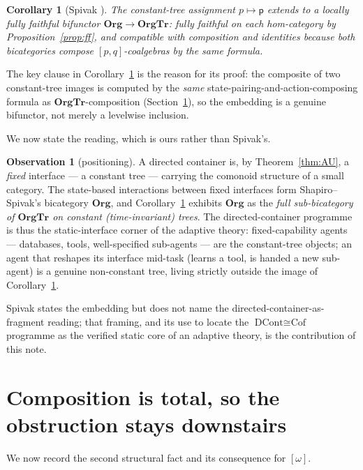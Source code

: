 \documentclass[11pt]{amsart}
\newtheorem{corollary}[theorem]{Corollary}
\theoremstyle{definition}
\newtheorem{observation}[theorem]{Observation}
\theoremstyle{remark}
\newcommand{\OrgTr}{\mathbf{OrgTr}}
\newcommand{\Org}{\mathbf{Org}}
\begin{document}
\begin{corollary}[Spivak {\cite[Cor.~4.8]{SpivakOrgTr}}]\label{cor:bifunctor}
The constant-tree assignment $p\mapsto\mathsf{p}$ extends to a locally fully faithful
bifunctor $\Org\to\OrgTr$: fully faithful on each hom-category by
Proposition~\textup{\ref{prop:ff}}, and compatible with composition and identities because
both bicategories compose $[p,q]$-coalgebras by the same formula.
\end{corollary}

The key clause in Corollary~\ref{cor:bifunctor} is the reason for its proof: the composite
of two constant-tree images is computed by the \emph{same} state-pairing-and-action-composing
formula as $\OrgTr$-composition (Section~\ref{sec:total}), so the embedding is a genuine
bifunctor, not merely a levelwise inclusion.

We now state the reading, which is ours rather than Spivak's.

\begin{observation}[positioning]\label{obs:positioning}
A directed container is, by Theorem~\textup{\ref{thm:AU}}, a \emph{fixed} interface --- a
constant tree --- carrying the comonoid structure of a small category. The state-based
interactions between fixed interfaces form Shapiro--Spivak's bicategory $\Org$, and
Corollary~\textup{\ref{cor:bifunctor}} exhibits $\Org$ as the \emph{full sub-bicategory of
$\OrgTr$ on constant (time-invariant) trees}. The directed-container programme is thus the
static-interface corner of the adaptive theory: fixed-capability agents --- databases,
tools, well-specified sub-agents --- are the constant-tree objects; an agent that reshapes
its interface mid-task (learns a tool, is handed a new sub-agent) is a genuine non-constant
tree, living strictly outside the image of Corollary~\textup{\ref{cor:bifunctor}}.
\end{observation}

Spivak states the embedding but does not name the directed-container-as-fragment reading;
that framing, and its use to locate the $\text{DCont}\cong\text{Cof}$ programme as the
verified static core of an adaptive theory, is the contribution of this note.

\section{Composition is total, so the obstruction stays downstairs}\label{sec:total}

We now record the second structural fact and its consequence for $[\omega]$.
\end{document}

